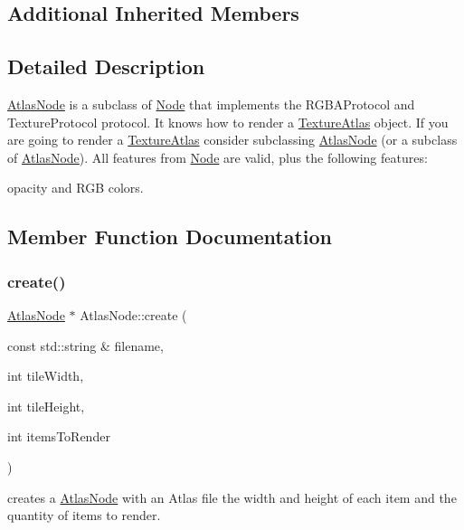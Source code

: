 \subsection*{Additional Inherited Members}


\subsection{Detailed Description}
\hyperlink{classAtlasNode}{Atlas\+Node} is a subclass of \hyperlink{classNode}{Node} that implements the R\+G\+B\+A\+Protocol and Texture\+Protocol protocol. It knows how to render a \hyperlink{classTextureAtlas}{Texture\+Atlas} object. If you are going to render a \hyperlink{classTextureAtlas}{Texture\+Atlas} consider subclassing \hyperlink{classAtlasNode}{Atlas\+Node} (or a subclass of \hyperlink{classAtlasNode}{Atlas\+Node}). All features from \hyperlink{classNode}{Node} are valid, plus the following features\+: 


\begin{DoxyItemize}
\item opacity and R\+GB colors. 
\end{DoxyItemize}

\subsection{Member Function Documentation}
\mbox{\label{classAtlasNode_a34f6cb836619df9e64c1915c67512b03}} 
\subsubsection{\texorpdfstring{create()}{create()}\hspace{0.1cm}{\footnotesize\ttfamily [1/2]}}
{\footnotesize\ttfamily \hyperlink{classAtlasNode}{Atlas\+Node} $\ast$ Atlas\+Node\+::create (\begin{DoxyParamCaption}\item[{const std\+::string \&}]{filename,  }\item[{int}]{tile\+Width,  }\item[{int}]{tile\+Height,  }\item[{int}]{items\+To\+Render }\end{DoxyParamCaption})\hspace{0.3cm}{\ttfamily [static]}}

creates a \hyperlink{classAtlasNode}{Atlas\+Node} with an Atlas file the width and height of each item and the quantity of items to render.


